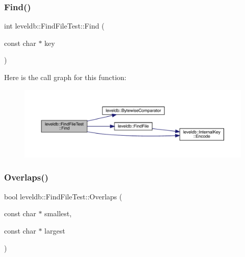 \mbox{\label{classleveldb_1_1_find_file_test_a233fd8c1e1764f2572e03d28b1f58ae0}} 
\subsubsection{\texorpdfstring{Find()}{Find()}}
{\footnotesize\ttfamily int leveldb\+::\+Find\+File\+Test\+::\+Find (\begin{DoxyParamCaption}\item[{const char $\ast$}]{key }\end{DoxyParamCaption})\hspace{0.3cm}{\ttfamily [inline]}}

Here is the call graph for this function\+:
\nopagebreak
\begin{figure}[H]
\begin{center}
\leavevmode
\includegraphics[width=350pt]{classleveldb_1_1_find_file_test_a233fd8c1e1764f2572e03d28b1f58ae0_cgraph}
\end{center}
\end{figure}
\mbox{\label{classleveldb_1_1_find_file_test_a617e51dc2e6acbe7d5bc6d0a7224ac51}} 
\subsubsection{\texorpdfstring{Overlaps()}{Overlaps()}}
{\footnotesize\ttfamily bool leveldb\+::\+Find\+File\+Test\+::\+Overlaps (\begin{DoxyParamCaption}\item[{const char $\ast$}]{smallest,  }\item[{const char $\ast$}]{largest }\end{DoxyParamCaption})\hspace{0.3cm}{\ttfamily [inline]}}

